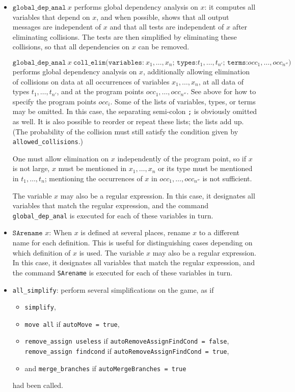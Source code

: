 \documentclass{article}
\begin{document}
\begin{itemize}
\item $\texttt{global\_dep\_anal}\ x$ performs global dependency
  analysis on $x$: it computes all variables that depend on $x$, and
  when possible, shows that all output messages are independent of $x$
  and that all tests are independent of $x$ after eliminating
  collisions. The tests are then simplified by eliminating these
  collisions, so that all dependencies on $x$ can be removed.

$\texttt{global\_dep\_anal}\ x\ \texttt{coll\_elim(variables:}\ x_1, \ldots, x_n\texttt{; types:}t_1, \ldots, t_{n'}\texttt{; terms:}occ_1, \ldots, occ_{n''}\texttt{)}$ 
performs global dependency analysis on $x$, 
additionally allowing elimination of collisions on data 
at all occurrences of variables
$x_1, \ldots, x_n$, at all data of types $t_1, \ldots, t_{n'}$,
and at the program points $occ_1, \ldots, occ_{n''}$.
See above for how to specify the program points $occ_i$. 
Some of the lists of variables, types, or terms may be omitted.
In this case, the separating semi-colon \texttt{;} is obviously
omitted as well. It is also possible to reorder or repeat these lists; the lists add up.
(The probability of the collision must still satisfy the
condition given by \texttt{allowed\string_collisions}.)

One must allow elimination on $x$ independently of the program point, 
so if $x$ is not large, $x$ must be mentioned in $x_1, \ldots, x_n$
or its type must be mentioned in $t_1, \ldots, t_n$;
mentioning the occurrences of $x$ in $occ_1, \ldots, occ_{n''}$
is not sufficient.

The variable $x$ may also be a regular expression.
In this case, it designates all variables that match the regular expression,
and the command \texttt{global\_dep\_anal} is executed for each of these variables in
turn.

\item $\texttt{SArename }x$: When $x$ is defined at several places,
rename $x$ to a different name for each definition. This is useful for
distinguishing cases depending on which definition of $x$ is used.
The variable $x$ may also be a regular expression.
In this case, it designates all variables that match the regular expression,
and the command \texttt{SArename} is executed for each of these variables in
turn.

\item \texttt{all\string_simplify}: perform several simplifications 
on the game, as if 
\begin{itemize}
\item \texttt{simplify}, 
\item \texttt{move all} if \texttt{autoMove = true}, 
\item \texttt{remove\string_assign useless} if \texttt{autoRemoveAssignFindCond = false}, \\
\texttt{remove\string_assign findcond} if \texttt{autoRemoveAssignFindCond = true},
\item and \texttt{merge\string_branches} if \texttt{autoMergeBranches = true}
\end{itemize}
had been called.


\end{itemize}
\end{document}
